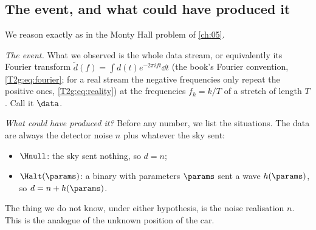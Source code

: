 \subsection{The event, and what could have produced it}
\label{10b:sec:detection-event}

We reason exactly as in the Monty Hall problem of \cref{ch:05}.

\emph{The event.} What we observed is the whole data stream, or equivalently its Fourier transform
$\tilde d(f)=\int d(t)e^{-2\pi ift}\dd t$ (the book's Fourier convention, \cref{T2g:eq:fourier}; for a real
stream the negative frequencies only repeat the positive ones, \cref{T2g:eq:reality}) at the frequencies $f_k=k/T$ of a stretch of length $T$. Call it
$\data$.

\emph{What could have produced it?} Before any number, we list the situations. The data are always
the detector noise $n$ plus whatever the sky sent:
\begin{itemize}[itemsep=1pt,leftmargin=1.2em]
  \item $\Hnull$: the sky sent nothing, so $d=n$;
  \item $\Halt(\params)$: a binary with parameters $\params$ sent a wave $h(\params)$, so $d=n+h(\params)$.
\end{itemize}
The thing we do not know, under either hypothesis, is the noise realisation $n$. This is the analogue of the
unknown position of the car.

